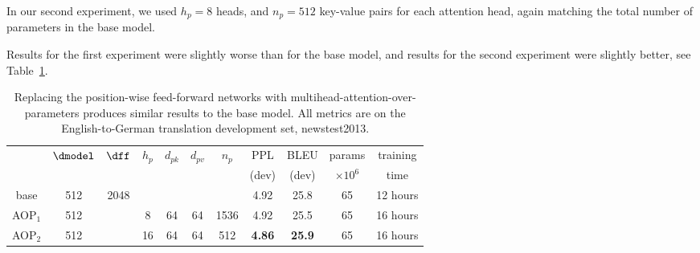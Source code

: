 In our second experiment, we used $h_p=8$ heads, and $n_p=512$ key-value pairs
for each attention head, again matching the total number of parameters in the
base model.

Results for the first experiment were slightly worse than for the base model,
and results for the second experiment were slightly better, see
Table~\ref{tab:parameter_attention}.

\begin{table}[h]
    \caption{Replacing the position-wise feed-forward networks with
        multihead-attention-over-parameters produces similar results to the base model.
        All metrics are on the English-to-German translation development set,
        newstest2013.}
    \label{tab:parameter_attention}
    \begin{center}
        \vspace{-2mm}
        \begin{tabular}{c|cccccc|cccc}
            \hline\rule{0pt}{2.0ex}
                                   & \multirow{2}{*}{$\dmodel$} & \multirow{2}{*}{$\dff$}   &
            \multirow{2}{*}{$h_p$} & \multirow{2}{*}{$d_{pk}$}  & \multirow{2}{*}{$d_{pv}$}
                                   &
            \multirow{2}{*}{$n_p$} &
            PPL                    & BLEU                       & params                    & training                                                                            \\
                                   &                            &                           &          &    &    &      & (dev)         & (dev)         & $\times10^6$ & time     \\
            \hline\rule{0pt}{2.0ex}
            base                   & 512                        & 2048                      &          &    &    &      & 4.92          & 25.8          & 65           & 12 hours \\
            \hline\rule{0pt}{2.0ex}
            AOP$_1$                & 512                        &                           & 8        & 64 & 64 & 1536 & 4.92          & 25.5          & 65           & 16 hours \\
            AOP$_2$                & 512                        &                           & 16       & 64 & 64 & 512  & \textbf{4.86} & \textbf{25.9} & 65           & 16
            hours                                                                                                                                                                 \\
            \hline
        \end{tabular}
    \end{center}
\end{table}
